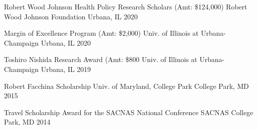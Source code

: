 




\begin{cvhonors}

  \cvhonor
    {Robert Wood Johnson Health Policy Research Scholars (Amt: \$124,000)} %
    {Robert Wood Johnson Foundation} %
    {Urbana, IL} %
    {2020} %

  \cvhonor
    {Margin of Excellence Program (Amt: \$2,000)} %
    {Univ. of Illinois at Urbana-Champaign} %
    {Urbana, IL} %
    {2020} %

  \cvhonor
    {Toshiro Nishida Research Award (Amt: \$800 } %
    {Univ. of Illinois at Urbana-Champaign} %
    {Urbana, IL} %
    {2019} %
    
  \cvhonor
    {Robert Facchina Scholarship } %
    {Univ. of Maryland, College Park} %
    {College Park, MD} %
    {2015} %
    
  \cvhonor
    {Travel Scholarship Award for the SACNAS National Conference } %
    {SACNAS} %
    {College Park, MD} %
    {2014} %


\end{cvhonors}

